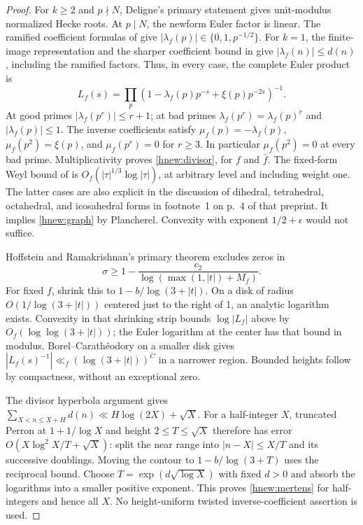 \begin{proof}
For $k\ge2$ and $p\nmid N$, Deligne's primary statement
\citep[Theorem~8.2, p.~302]{deligne1974}
gives unit-modulus normalized Hecke roots.
At $p\mid N$, the newform Euler factor is linear.
The ramified coefficient formulas of
\citet[\S\S1.7--1.8, pp.~509--510]{deligneserre1974}
give $|\lambda_f(p)|\in\{0,1,p^{-1/2}\}$.
For $k=1$, the finite-image representation and the sharper
coefficient bound in
\citet[Theorem~9.1 and equation~(9.3), p.~527]{deligneserre1974}
give $|\lambda_f(n)|\le d(n)$, including the ramified factors.
Thus, in every case, the complete Euler product is
\[
 L_f(s)=\prod_p
     (1-\lambda_f(p)p^{-s}+\xi(p)p^{-2s})^{-1}.
\]
At good primes $|\lambda_f(p^r)|\le r+1$; at bad primes
$\lambda_f(p^r)=\lambda_f(p)^r$ and $|\lambda_f(p)|\le1$.
The inverse coefficients satisfy
$\mu_f(p)=-\lambda_f(p)$, $\mu_f(p^2)=\xi(p)$, and
$\mu_f(p^r)=0$ for $r\ge3$.
In particular $\mu_f(p^2)=0$ at every bad prime.
Multiplicativity proves \eqref{hnew:divisor}, for $f$ and $\bar f$.
The fixed-form Weyl bound of
\citet[Theorem~1.1, p.~2 of the author preprint]{booker2019}
is $O_f(|\tau|^{1/3}\log|\tau|)$, at arbitrary level and
including weight one.  The latter cases are also explicit in
the discussion of dihedral, tetrahedral, octahedral, and
icosahedral forms in footnote~1 on p.~4 of that preprint.
It implies \eqref{hnew:graph} by Plancherel.
Convexity with exponent $1/2+\epsilon$ would not suffice.

Hoffstein and Ramakrishnan's primary theorem
\citep[Theorem~C(3), p.~299]{hoffsteinram1995}
excludes zeros in
\[
 \sigma\ge1-\frac{c_2}{\log(\max(1,|t|)+M_f)}.
\]
For fixed $f$, shrink this to $1-b/\log(3+|t|)$.
On a disk of radius $O(1/\log(3+|t|))$ centered just to the
right of 1, an analytic logarithm exists.
Convexity in that shrinking strip bounds $\log|L_f|$ above by
$O_f(\log\log(3+|t|))$; the Euler logarithm at the center has
that bound in modulus.  Borel--Carath\'eodory on a smaller disk gives
$|L_f(s)^{-1}|\ll_f(\log(3+|t|))^C$ in a narrower region.
Bounded heights follow by compactness, without an exceptional zero.

The divisor hyperbola argument gives
$\sum_{X<n\le X+H}d(n)\ll H\log(2X)+\sqrt X$.
For a half-integer $X$, truncated Perron at $1+1/\log X$ and
height $2\le T\le\sqrt X$ therefore has error
$O(X\log^2X/T+\sqrt X)$: split the near range into
$|n-X|\le X/T$ and its successive doublings.
Moving the contour to $1-b/\log(3+T)$ uses the reciprocal bound.
Choose $T=\exp(d\sqrt{\log X})$ with fixed $d>0$ and absorb the
logarithms into a smaller positive exponent.  This proves
\eqref{hnew:mertens} for half-integers and hence all $X$.
No height-uniform twisted inverse-coefficient assertion is used.


\end{proof}
